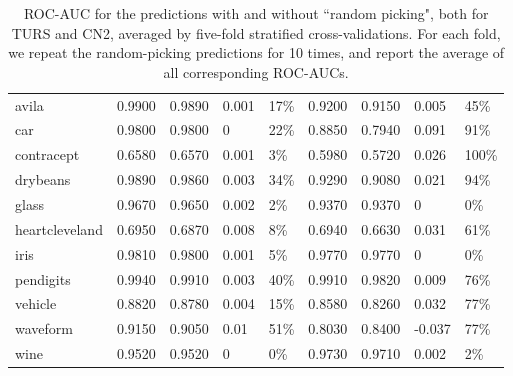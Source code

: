 \begin{table}[ht]
\begin{tabular}{l|rrll|rrll}
  avila & 0.9900 & 0.9890 & 0.001 & 17\% & 0.9200 & 0.9150 & 0.005 & 45\% \\ 
  car & 0.9800 & 0.9800 & 0 & 22\% & 0.8850 & 0.7940 & 0.091 & 91\% \\ 
  contracept & 0.6580 & 0.6570 & 0.001 & 3\% & 0.5980 & 0.5720 & 0.026 & 100\% \\ 
  drybeans & 0.9890 & 0.9860 & 0.003 & 34\% & 0.9290 & 0.9080 & 0.021 & 94\% \\ 
  glass & 0.9670 & 0.9650 & 0.002 & 2\% & 0.9370 & 0.9370 & 0 & 0\% \\ 
  heartcleveland & 0.6950 & 0.6870 & 0.008 & 8\% & 0.6940 & 0.6630 & 0.031 & 61\% \\ 
  iris & 0.9810 & 0.9800 & 0.001 & 5\% & 0.9770 & 0.9770 & 0 & 0\% \\ 
  pendigits & 0.9940 & 0.9910 & 0.003 & 40\% & 0.9910 & 0.9820 & 0.009 & 76\% \\ 
  vehicle & 0.8820 & 0.8780 & 0.004 & 15\% & 0.8580 & 0.8260 & 0.032 & 77\% \\ 
  waveform & 0.9150 & 0.9050 & 0.01 & 51\% & 0.8030 & 0.8400 & -0.037 & 77\% \\ 
  wine & 0.9520 & 0.9520 & 0 & 0\% & 0.9730 & 0.9710 & 0.002 & 2\% \\ 
   \hline
\end{tabular}
\caption{ROC-AUC for the predictions with and without ``random picking", both for TURS and CN2, averaged by five-fold stratified cross-validations. For each fold, we repeat the random-picking predictions for 10 times, and report the average of all corresponding ROC-AUCs. } \label{table:roc_auc_rp}
\end{table}